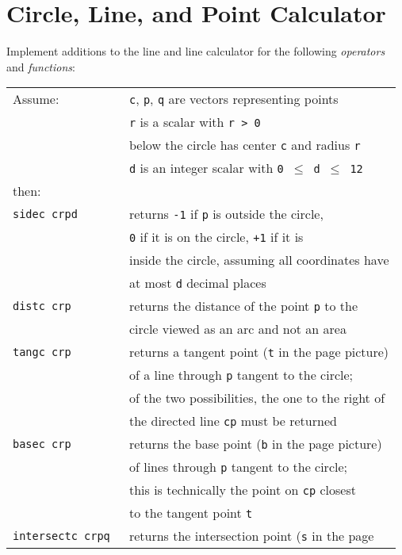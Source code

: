 \documentclass[12pt]{article}
\begin{document}
\newpage

\section{Circle, Line, and Point Calculator}
Implement additions to the line and line calculator for
the following {\em operators} and {\em functions}:
\begin{center}
\begin{tabular}{l@{~~~~~}l}
Assume: & {\tt c}, {\tt p}, {\tt q} are vectors representing points \\
	& {\tt r} is a scalar with {\tt r > 0} \\
	& below the circle has center {\tt c} and radius {\tt r} \\
	& {\tt d} is an integer scalar with {\tt 0 $\leq$ d $\leq$ 12} \\
then: \\[1ex]
\tt sidec~crpd & returns {\tt -1} if {\tt p} is outside the circle, \\
               & {\tt 0} if it is on the circle, {\tt +1} if it is \\
	       & inside the circle, assuming all coordinates have \\
	       & at most {\tt d} decimal places \\
\tt distc crp  & returns the distance of the point {\tt p} to the  \\
               & circle viewed as an arc and not an area \\
\tt tangc crp  & returns a tangent point ({\tt t} in the page
                 \pageref{TANGENT-PICTURE} picture) \\
               & of a line through {\tt p} tangent to the circle; \\
	       & of the two possibilities, the one to the right of \\
	       & the directed line {\tt cp} must be returned \\
\tt basec crp  & returns the base point ({\tt b} in the page
                 \pageref{TANGENT-PICTURE} picture) \\
               & of lines through {\tt p} tangent to the circle; \\
	       & this is technically the point on {\tt cp} closest \\
	       & to the tangent point {\tt t} \\
\tt intersectc crpq  & returns the intersection point
                       ({\tt s} in the page \pageref{INTERSECTION-PICTURE} \\

\end{tabular}
\end{center}
\end{document}
